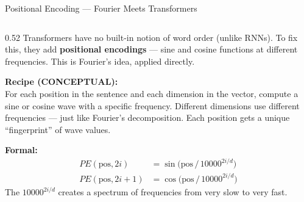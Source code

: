 \begin{frame}[shrink=22]{Positional Encoding --- Fourier Meets Transformers}

  \begin{columns}[T]
    \begin{column}{0.52\textwidth}
      {\small Transformers have no built-in notion of word order (unlike
      RNNs). To fix this, they add \textbf{positional encodings} ---
      sine and cosine functions at different frequencies.
      This is Fourier's idea, applied directly.}

      \vspace{0.4em}

      \textbf{Recipe (CONCEPTUAL):}\\
      {\small For each position in the sentence and each dimension in
      the vector, compute a sine or cosine wave with a specific
      frequency. Different dimensions use different frequencies ---
      just like Fourier's decomposition. Each position gets a unique
      ``fingerprint'' of wave values.}

      \vspace{0.3em}

      \begin{tcolorbox}[colback=gray!5,colframe=gray!40,
        boxrule=0.5pt,rounded corners,left=3pt,right=3pt,top=2pt,bottom=2pt]
        {\scriptsize\textbf{Formal:}
        \begin{align*}
          PE(\text{pos}, 2i) &= \sin\!\bigl(\text{pos}\, /\, 10000^{2i/d}\bigr)\\
          PE(\text{pos}, 2i{+}1) &= \cos\!\bigl(\text{pos}\, /\, 10000^{2i/d}\bigr)
        \end{align*}
        The $10000^{2i/d}$ creates a spectrum of frequencies from
        very slow to very fast.}
      \end{tcolorbox}
    \end{column}


\end{columns}
\end{frame}
